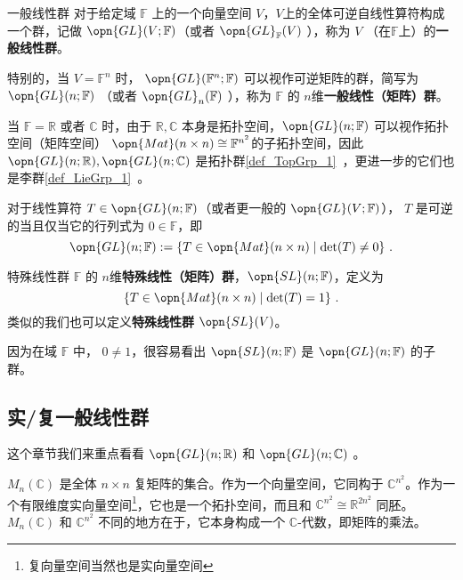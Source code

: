 

\begin{definition}{一般线性群}\label{def_GL_1}
对于给定域 $\mathbb{F}$ 上的一个向量空间 $V$，$V$上的全体可逆自线性算符构成一个群，记做 $\opn{GL}(V; \mathbb{F})$（或者 $\opn{GL}_{\mathbb{F}}(V)$ ），称为 $V$ （在$\mathbb{F}$上）的\textbf{一般线性群}。

特别的，当 $V = \mathbb{F}^n$ 时， $\opn{GL}(\mathbb{F}^n; \mathbb{F})$ 可以视作可逆矩阵的群，简写为 $\opn{GL}(n; \mathbb{F})$ （或者 $\opn{GL}_n(\mathbb{F})$ ），称为 $\mathbb{F}$ 的 $n$维\textbf{一般线性（矩阵）群}。

当 $\mathbb{F} = \mathbb{R}$ 或者 $\mathbb{C}$ 时，由于 $\mathbb{R}, \mathbb{C}$ 本身是拓扑空间，$\opn{GL}(n; \mathbb{F})$ 可以视作拓扑空间（矩阵空间） $\opn{Mat}(n \times n) \cong \mathbb{F}^{n^2}$的子拓扑空间，因此 $\opn{GL}(n; \mathbb{R}), \opn{GL}(n; \mathbb{C})$ 是拓扑群\autoref{def_TopGrp_1}~，更进一步的它们也是李群\autoref{def_LieGrp_1}~。
\end{definition}

对于线性算符 $T \in \opn{GL}(n; \mathbb{F})$（或者更一般的 $\opn{GL}(V; \mathbb{F})$）， $T$ 是可逆的当且仅当它的行列式为 $0 \in \mathbb{F}$，即
$$
\opn{GL}(n; \mathbb{F}): = \{T \in \opn{Mat}(n \times n) \mid \det(T) \neq 0\}~.
$$

\begin{definition}{特殊线性群}
$\mathbb{F}$ 的 $n$维\textbf{特殊线性（矩阵）群}，$\opn{SL}(n; \mathbb{F})$，定义为
$$
\{T \in \opn{Mat}(n \times n) \mid \det(T) = 1\}~.
$$
类似的我们也可以定义\textbf{特殊线性群} $\opn{SL}(V)$。
\end{definition}

因为在域 $\mathbb{F}$ 中， $0 \neq 1$，很容易看出 $\opn{SL}(n; \mathbb{F})$ 是 $\opn{GL}(n; \mathbb{F})$ 的子群。

\subsection{实/复一般线性群}

这个章节我们来重点看看 $\opn{GL}(n; \mathbb{R})$ 和 $\opn{GL}(n; \mathbb{C})$ 。

$M_n(\mathbb{C})$ 是全体 $n \times n$ 复矩阵的集合。作为一个向量空间，它同构于 $\mathbb{C}^{n^2}$。作为一个有限维度实向量空间\footnote{复向量空间当然也是实向量空间}，它也是一个拓扑空间，而且和 $\mathbb{C}^{n^2} \cong \mathbb{R}^{2 n^2}$ 同胚。$M_n(\mathbb{C})$ 和 $\mathbb{C}^{n^2}$ 不同的地方在于，它本身构成一个 $\mathbb{C}$-代数，即矩阵的乘法。

